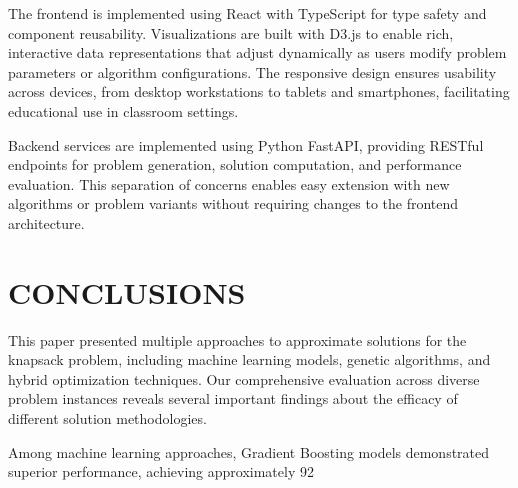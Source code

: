 \documentclass[conference, a4paper]{IEEEtran}
\begin{document}
The frontend is implemented using React with TypeScript for type safety and component reusability. Visualizations are built with D3.js to enable rich, interactive data representations that adjust dynamically as users modify problem parameters or algorithm configurations. The responsive design ensures usability across devices, from desktop workstations to tablets and smartphones, facilitating educational use in classroom settings.

Backend services are implemented using Python FastAPI, providing RESTful endpoints for problem generation, solution computation, and performance evaluation. This separation of concerns enables easy extension with new algorithms or problem variants without requiring changes to the frontend architecture.

\section{CONCLUSIONS}

This paper presented multiple approaches to approximate solutions for the knapsack problem, including machine learning models, genetic algorithms, and hybrid optimization techniques. Our comprehensive evaluation across diverse problem instances reveals several important findings about the efficacy of different solution methodologies.

Among machine learning approaches, Gradient Boosting models demonstrated superior performance, achieving approximately 92%
\end{document}
